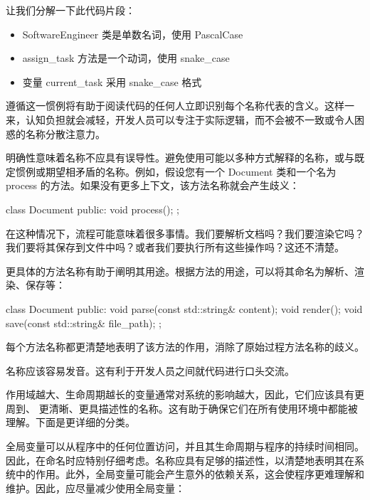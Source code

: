 让我们分解一下此代码片段：

\begin{itemize}
\item
SoftwareEngineer 类是单数名词，使用 PascalCase

\item
assign\_task 方法是一个动词，使用 snake\_case

\item
变量 current\_task 采用 snake\_case 格式
\end{itemize}

遵循这一惯例将有助于阅读代码的任何人立即识别每个名称代表的含义。这样一来，认知负担就会减轻，开发人员可以专注于实际逻辑，而不会被不一致或令人困惑的名称分散注意力。


明确性意味着名称不应具有误导性。避免使用可能以多种方式解释的名称，或与既定惯例或期望相矛盾的名称。例如，假设您有一个 Document 类和一个名为 process 的方法。如果没有更多上下文，该方法名称就会产生歧义：

\begin{cpp}
class Document {
public:
    void process();
};
\end{cpp}

在这种情况下，流程可能意味着很多事情。我们要解析文档吗？我们要渲染它吗？我们要将其保存到文件中吗？或者我们要执行所有这些操作吗？这还不清楚。

更具体的方法名称有助于阐明其用途。根据方法的用途，可以将其命名为解析、渲染、保存等：

\begin{cpp}
class Document {
public:
    void parse(const std::string& content);
    void render();
    void save(const std::string& file_path);
};
\end{cpp}

每个方法名称都更清楚地表明了该方法的作用，消除了原始过程方法名称的歧义。


名称应该容易发音。这有利于开发人员之间就代码进行口头交流。


作用域越大、生命周期越长的变量通常对系统的影响越大，因此，它们应该具有更周到、 更清晰、更具描述性的名称。这有助于确保它们在所有使用环境中都能被理解。下面是更详细的分类。

全局变量可以从程序中的任何位置访问，并且其生命周期与程序的持续时间相同。因此，在命名时应特别仔细考虑。名称应具有足够的描述性，以清楚地表明其在系统中的作用。此外，全局变量可能会产生意外的依赖关系，这会使程序更难理解和维护。因此，应尽量减少使用全局变量：

